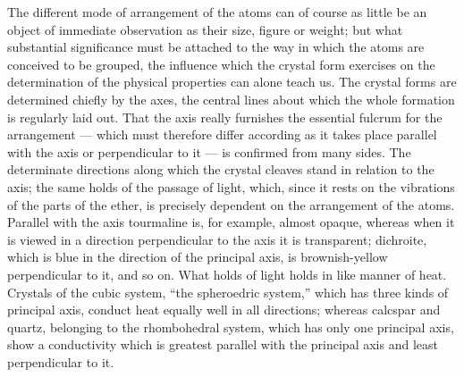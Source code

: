 \documentclass[12pt,a4paper]{book}
\begin{document}
The different mode of arrangement of the atoms can of course as little be an
object of immediate observation as their size, figure or weight; but what
substantial significance must be attached to the way in which the atoms are
conceived to be grouped, the influence which the crystal form exercises on the
determination of the physical properties can alone teach us. The crystal forms
are determined chiefly by the axes, the central lines about which the whole
formation is regularly laid out. That the axis really furnishes the essential
fulcrum for the arrangement --- which must therefore differ according as it
takes place parallel with the axis or perpendicular to it --- is confirmed from
many sides. The determinate directions along which the crystal cleaves stand in
relation to the axis; the same holds of the passage of light, which, since it
rests on the vibrations of the parts of the ether, is precisely dependent on
the arrangement of the atoms. Parallel with the axis tourmaline is, for
example, almost opaque, whereas when it is viewed in a direction perpendicular
to the axis it is transparent; dichroite, which is blue in the direction of the
principal axis, is brownish-yellow perpendicular to it, and so on. What holds
of light holds in like manner of heat. Crystals of the cubic system, ``the
spheroedric system,'' which has three kinds of principal axis, conduct heat
equally well in all directions; whereas calcspar and quartz, belonging to the
rhombohedral system, which has only one principal axis, show a conductivity
which is greatest parallel with the principal axis and least perpendicular to
it.
\end{document}

